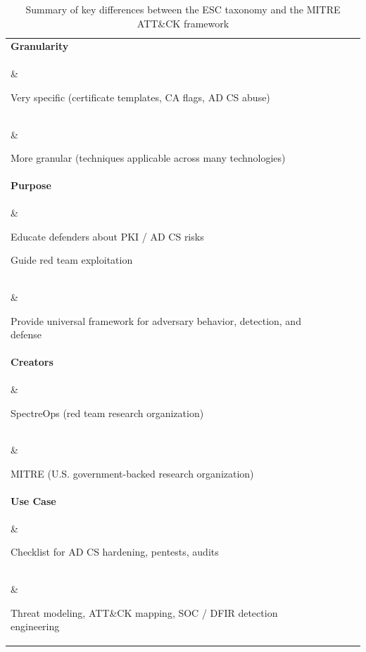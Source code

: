 {\begin{itemiz3
021e}
\begin{table}[htbp]
\begin{tabular}{|p{3.5cm}|p{4.5cm}|p{5cm}|p{4cm}|}
\textbf{Granularity} \\\& 
\begin{compactitem}
    \item Very specific (certificate templates, CA flags, AD CS abuse)
\end{compactitem} \\\& 
\begin{compactitem}
    \item More granular (techniques applicable across many technologies)
\end{compactitem} \\
\hline

\textbf{Purpose} \\\& 
\begin{compactitem}
    \item Educate defenders about PKI / AD CS risks
    \item Guide red team exploitation
\end{compactitem} \\\& 
\begin{compactitem}
    \item Provide universal framework for adversary behavior, detection, and defense
\end{compactitem} \\
\hline

\textbf{Creators} \\\& 
\begin{compactitem}
    \item SpectreOps (red team research organization)
\end{compactitem} \\\& 
\begin{compactitem}
    \item MITRE (U.S. government-backed research organization)
\end{compactitem} \\
\hline

\textbf{Use Case} \\\& 
\begin{compactitem}
    \item Checklist for AD CS hardening, pentests, audits
\end{compactitem} \\\& 
\begin{compactitem}
    \item Threat modeling, ATT\&CK mapping, SOC / DFIR detection engineering
\end{compactitem} \\
\hline
\end{tabular}
\caption{Summary of key differences between the ESC taxonomy and the MITRE ATT\&CK framework}
\end{table}


\end{itemiz3
021e}}

